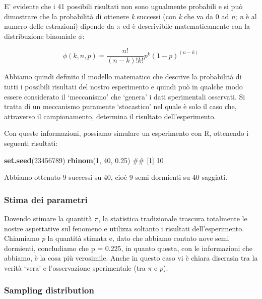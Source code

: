 \documentclass[a4paper,12pt,oneside]{book}
\newenvironment{Shaded}{\begin{snugshade}}{\end{snugshade}}
\newcommand{\KeywordTok}[1]{\textcolor[rgb]{0.13,0.29,0.53}{\textbf{#1}}}
\newcommand{\DecValTok}[1]{\textcolor[rgb]{0.00,0.00,0.81}{#1}}
\newcommand{\FloatTok}[1]{\textcolor[rgb]{0.00,0.00,0.81}{#1}}
\newcommand{\NormalTok}[1]{#1}
\theoremstyle{definition}
\theoremstyle{definition}
\theoremstyle{definition}
\theoremstyle{remark}
\begin{document}
E' evidente che i 41 possibili risultati non sono ugualmente probabili e
si può dimostrare che la probabilità di ottenere \emph{k} successi (con
\emph{k} che va da 0 ad \emph{n}; \emph{n} è al numero delle estrazioni)
dipende da \(\pi\) ed è descrivibile matematicamente con la
distribuzione binomiale \(\phi\):

\[\phi(k, n, p) = \frac{n!}{(n-k)!k!} p^k (1 - p)^{(n-k)}\]

Abbiamo quindi definito il modello matematico che descrive la
probabilità di tutti i possibili risultati del nostro esperimento e
quindi può in qualche modo essere considerato il `meccanismo' che
`genera' i dati sperimentali osservati. Si tratta di un meccanismo
puramente `stocastico' nel quale è solo il caso che, attraverso il
campionamento, determina il risultato dell'esperimento.

Con queste informazioni, possiamo simulare un esperimento con R,
ottenendo i seguenti risultati:

\begin{Shaded}
\begin{Highlighting}[]
\KeywordTok{set.seed}\NormalTok{(}\DecValTok{23456789}\NormalTok{)}
\KeywordTok{rbinom}\NormalTok{(}\DecValTok{1}\NormalTok{, }\DecValTok{40}\NormalTok{, }\FloatTok{0.25}\NormalTok{)}
\NormalTok{## [1] 10}
\end{Highlighting}
\end{Shaded}

Abbiamo ottenuto 9 successi su 40, cioè 9 semi dormienti su 40 saggiati.

\subsubsection{Stima dei parametri}\label{stima-dei-parametri-4}

Dovendo stimare la quantità \(\pi\), la statistica tradizionale trascura
totalmente le nostre aspettative sul fenomeno e utilizza soltanto i
risultati dell'esperimento. Chiamiamo \emph{p} la quantità stimata e,
dato che abbiamo contato nove semi dormienti, concludiamo che p = 0.225,
in quanto questa, con le informazioni che abbiamo, è la cosa più
verosimile. Anche in questo caso vi è chiara discrasia tra la verità
`vera' e l'osservazione sperimentale (tra \(\pi\) e \(p\)).

\subsubsection{Sampling distribution}\label{sampling-distribution}
\end{document}
